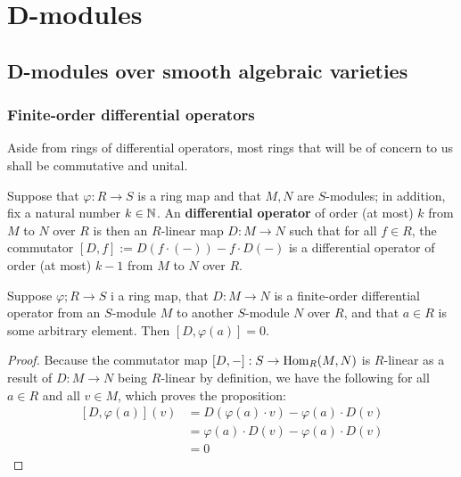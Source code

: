 \section{D-modules}
    \subsection{D-modules over smooth algebraic varieties}
        \subsubsection{Finite-order differential operators}
            \begin{convention}
                Aside from rings of differential operators, most rings that will be of concern to us shall be commutative and unital.
            \end{convention}
            \begin{definition} \label{def: differential_operators}
                Suppose that $\varphi: R \to S$ is a ring map and that $M, N$ are $S$-modules; in addition, fix a natural number $k \in \mathbb{N}$. An \textbf{differential operator} of order (at most) $k$ from $M$ to $N$ over $R$ is then an $R$-linear map $D: M \to N$ such that for all $f \in R$, the commutator $[D, f] := D(f \cdot (-)) - f \cdot D(-)$ is a differential operator of order (at most) $k - 1$ from $M$ to $N$ over $R$. 
            \end{definition}
            \begin{proposition} \label{prop: differential_operators_act_as_zero_on_constants}
                Suppose $\varphi; R \to S$ i a ring map, that $D: M \to N$ is a finite-order differential operator from an $S$-module $M$ to another $S$-module $N$ over $R$, and that $a \in R$ is some arbitrary element. Then $[D, \varphi(a)] = 0$.
            \end{proposition}
                \begin{proof}
                    Because the commutator map $[D, -]: S \to \mathrm{Hom}_R(M, N)$ is $R$-linear as a result of $D: M \to N$ being $R$-linear by definition, we have the following for all $a \in R$ and all $v \in M$, which proves the proposition:
                        $$
                            \begin{aligned}
                                [D, \varphi(a)](v) & = D(\varphi(a) \cdot v) - \varphi(a) \cdot D(v)
                                \\
                                & = \varphi(a) \cdot D(v) - \varphi(a) \cdot D(v)
                                \\
                                & = 0
                            \end{aligned}
                        $$
                \end{proof}
